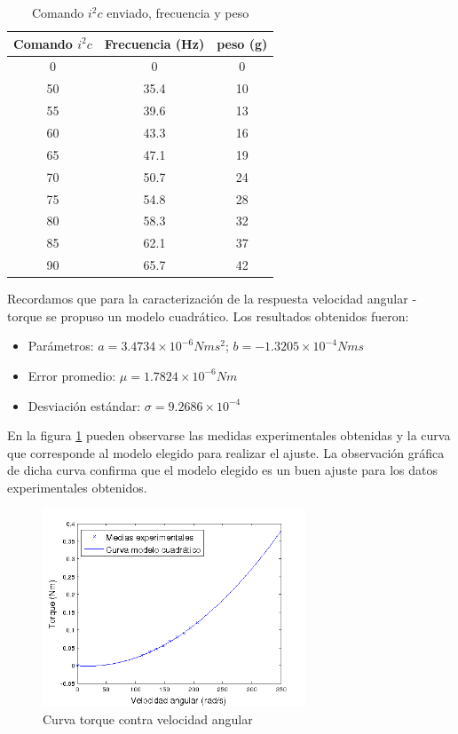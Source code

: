 \documentclass[main]{subfiles}
\begin{document}
\begin{table}[h]
\centering
\begin{tabular}{|c|c|c|} 
	\hline
	\cellcolor[gray]{0.8} \textbf{Comando $i^2c$} & 
	\cellcolor[gray]{0.8} \textbf{Frecuencia (Hz)} & \cellcolor[gray]{0.8} \textbf{peso (g)} \\ \hline \hline
	  0 & 0    & 0 \\ \hline
	 50 & 35.4 & 10 \\ \hline
	 55 & 39.6 & 13 \\ \hline
	 60 & 43.3 & 16  \\ \hline
     65 & 47.1 & 19\\ \hline
     70 & 50.7 & 24 \\ \hline
	 75 & 54.8 & 28 \\ \hline
	 80 & 58.3 & 32  \\ \hline
	 85 & 62.1 & 37\\ \hline     
     90 & 65.7 & 42\\ \hline          
\end{tabular}
\caption{Comando $i^2c$ enviado, frecuencia y peso}
\label{tab:torque}
\end{table}

Recordamos que para la caracterizaci\'on de la respuesta velocidad angular - torque se propuso un modelo cuadr\'atico. Los resultados obtenidos fueron:

\begin{itemize}
\item Par\'ametros: $a=3.4734\times10^{-6}Nms^2$; $b=-1.3205\times 10 ^{-4} Nms$
\item Error promedio: $\mu = 1.7824\times 10^{-6}Nm$
\item Desviaci\'on est\'andar: $\sigma = 9.2686\times 10^{-4}$ 
\end{itemize}

En la figura \ref{fig:torque} pueden observarse las medidas experimentales obtenidas y la curva que corresponde al modelo elegido para realizar el ajuste. La observaci\'on gr\'afica de dicha curva confirma que el modelo elegido es un buen ajuste para los datos experimentales obtenidos.

\begin{figure}
  \begin{center}
	\includegraphics[width=0.7\textwidth]{./pics_motores/torque.png}
  \end{center}
  \caption{Curva torque contra velocidad angular}
  \label{fig:torque}
\end{figure}
\end{document}

